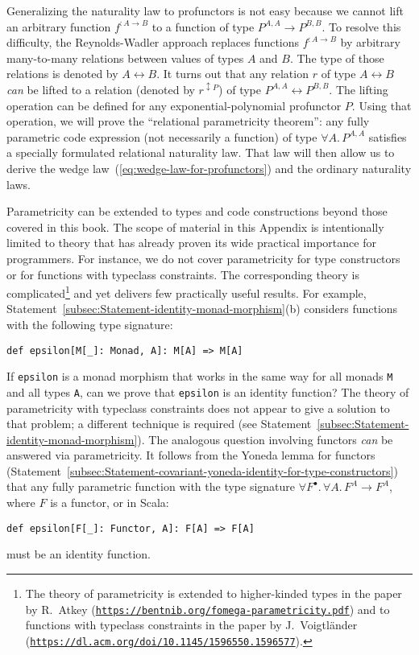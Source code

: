Generalizing the naturality law to profunctors is not easy because
we cannot lift an arbitrary function $f^{:A\rightarrow B}$ to a function
of type $P^{A,A}\rightarrow P^{B,B}$. To resolve this difficulty,
the Reynolds-Wadler approach replaces functions $f^{:A\rightarrow B}$
by arbitrary many-to-many relations between values of types $A$ and
$B$. The type of those relations is denoted by $A\leftrightarrow B$.
It turns out that any relation $r$ of type $A\leftrightarrow B$
\emph{can} be lifted to a relation (denoted by $r^{\updownarrow P}$)
of type $P^{A,A}\leftrightarrow P^{B,B}$. The lifting operation can
be defined for any exponential-polynomial profunctor $P$. Using that
operation, we will prove the \textsf{``}relational parametricity theorem\textsf{''}:
any fully parametric code expression (not necessarily a function)
of type $\forall A.\,P^{A,A}$ satisfies a specially formulated relational
naturality law. That law will then allow us to derive the wedge law~(\ref{eq:wedge-law-for-profunctors})
and the ordinary naturality laws.

Parametricity can be extended to types and code constructions beyond
those covered in this book. The scope of material in this Appendix
is intentionally limited to theory that has already proven its wide
practical importance for programmers. For instance, we do not cover
parametricity for type constructors or for functions with typeclass
constraints. The corresponding theory is complicated\footnote{The theory of parametricity is extended to higher-kinded types in
the paper by R.~Atkey (\texttt{\href{https://bentnib.org/fomega-parametricity.pdf}{https://bentnib.org/fomega-parametricity.pdf}})
and to functions with typeclass constraints in the paper by J.~Voigtl\"ander
(\texttt{\href{https://dl.acm.org/doi/10.1145/1596550.1596577}{https://dl.acm.org/doi/10.1145/1596550.1596577}}).} and yet delivers few practically useful results. For example, Statement~\ref{subsec:Statement-identity-monad-morphism}(b)
considers functions with the following type signature:
\begin{lstlisting}
def epsilon[M[_]: Monad, A]: M[A] => M[A]
\end{lstlisting}
If \lstinline!epsilon! is a monad morphism that works in the same
way for all monads \lstinline!M! and all types \lstinline!A!, can
we prove that \lstinline!epsilon! is an identity function? The theory
of parametricity with typeclass constraints does not appear to give
a solution to that problem; a different technique is required (see
Statement~\ref{subsec:Statement-identity-monad-morphism}). The analogous
question involving functors \emph{can} be answered via parametricity.
It follows from the Yoneda lemma for functors (Statement~\ref{subsec:Statement-covariant-yoneda-identity-for-type-constructors})
that any fully parametric function with the type signature $\forall F^{\bullet}.\,\forall A.\,F^{A}\rightarrow F^{A}$,
where $F$ is a functor, or in Scala:
\begin{lstlisting}
def epsilon[F[_]: Functor, A]: F[A] => F[A]
\end{lstlisting}
must be an identity function.

